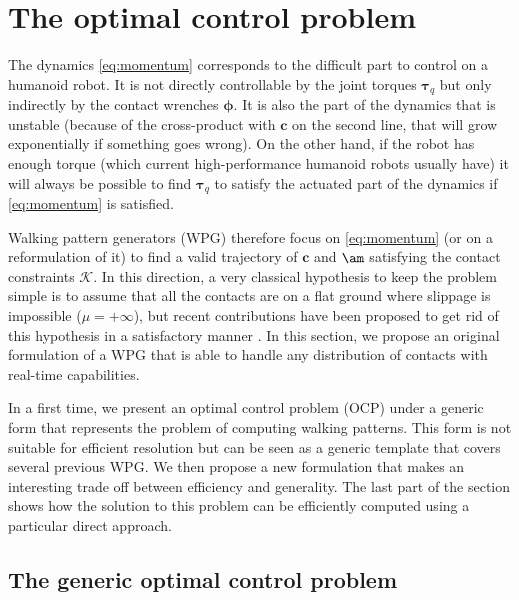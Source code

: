 \section{The optimal control problem}
\label{sec:ocp}

The dynamics \eqref{eq:momentum} corresponds to the difficult part to control on a humanoid robot. It is not directly controllable by the joint torques $\bm \tau_q$ but only indirectly by the contact wrenches $\bm\phi$.
It is also the part of the dynamics that is unstable (because of the cross-product with $\bm c$ on the second line, that will grow exponentially if something goes wrong). On the other hand, if the robot has enough torque (which current high-performance humanoid robots usually have) it will always be possible to find $\bm \tau_q$ to satisfy the actuated part of the dynamics if \eqref{eq:momentum} is satisfied.

Walking pattern generators (WPG) therefore focus on \eqref{eq:momentum} (or on a reformulation of it) to find a valid trajectory of $\bm c$ and $\am$ satisfying the contact constraints $\mathcal{K}$. In this direction, a very classical hypothesis to keep the problem simple is to assume that all the contacts are on a flat ground where slippage is impossible ($\mu = +\infty$), but recent contributions have been proposed to get rid of this hypothesis in a satisfactory manner \cite{kudruss_ichr15,rotella_humanoid15,perrin_isrr15}. In this section, we propose an original formulation of a WPG that is able to handle any distribution of contacts with real-time capabilities.

In a first time, we present an optimal control problem (OCP) under a generic form that represents the problem of computing walking patterns. This form is not suitable for efficient resolution but can be seen as a generic template that covers several previous WPG. We then propose a new formulation that makes an interesting trade off between efficiency and generality. The last part of the section shows how the solution to this problem can be efficiently computed using a particular direct approach.

\subsection{The generic optimal control problem}

